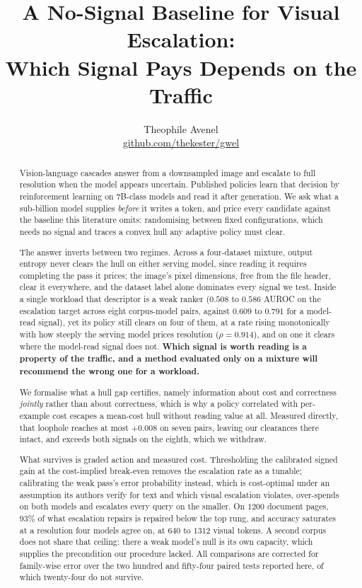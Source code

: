\documentclass[10pt,twocolumn]{article}
\title{\vspace{-2em}\textbf{A No-Signal Baseline for Visual Escalation:\\
Which Signal Pays Depends on the Traffic}\vspace{-0.5em}}
\author{Theophile Avenel\\
\small\href{https://github.com/thekester/gwel}{github.com/thekester/gwel}}
\date{}
\theoremstyle{plain}
\begin{document}
\maketitle

\begin{abstract}
Vision-language cascades answer from a downsampled image and escalate to full
resolution when the model appears uncertain. Published policies learn that
decision by reinforcement learning on 7B-class models and read it after
generation. We ask what a sub-billion model supplies \emph{before} it writes a
token, and price every candidate against the baseline this literature omits:
randomising between fixed configurations, which needs no signal and traces a
convex hull any adaptive policy must clear.

The answer inverts between two regimes. Across a four-dataset mixture, output
entropy never clears the hull on either serving model, since reading it
requires completing the pass it prices; the image's pixel dimensions, free from
the file header, clear it everywhere, and the dataset label alone dominates
every signal we test. Inside a single workload that descriptor is a weak ranker
($0.508$ to $0.586$ AUROC on the escalation target across eight corpus-model
pairs, against $0.609$ to $0.791$ for a model-read signal), yet its policy
still clears on four of them, at a rate rising monotonically with how steeply
the serving model prices resolution ($\rho = 0.914$), and on one it clears
where the model-read signal does not.
\textbf{Which signal is worth reading is a property of the traffic, and a
method evaluated only on a mixture will recommend the wrong one for a
workload.}

We formalise what a hull gap certifies, namely information about cost and
correctness \emph{jointly} rather than about correctness, which is why a policy
correlated with per-example cost escapes a mean-cost hull without reading value
at all. Measured directly, that loophole reaches at most $+0.008$ on seven
pairs, leaving our clearances there intact, and exceeds both signals on the
eighth, which we withdraw.

What survives is graded action and measured cost. Thresholding the calibrated
signed gain at the cost-implied break-even removes the escalation rate as a
tunable; calibrating the weak pass's error probability instead, which is
cost-optimal under an assumption its authors verify for text and which visual
escalation violates, over-spends on both models and escalates every query on
the smaller. On $1200$ document pages, $93\%$ of what escalation repairs is
repaired below the top rung, and accuracy saturates at a resolution four models
agree on, at $640$ to $1312$ visual tokens. A second corpus does not share that
ceiling: there a weak model's null is its own capacity, which supplies the
precondition our procedure lacked. All comparisons are corrected for
family-wise error over the two hundred and fifty-four paired tests reported
here, of which twenty-four do not survive.
\end{abstract}
\end{document}
